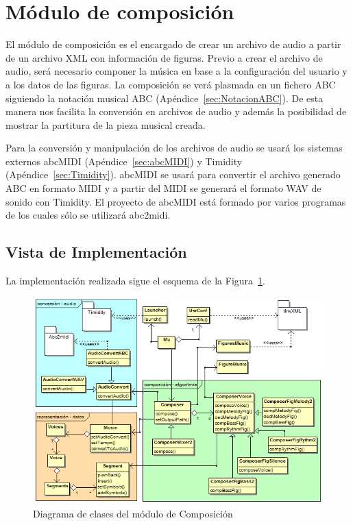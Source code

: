\section{Módulo de composición}


El módulo de composición es el encargado de crear un archivo de audio a partir de un archivo XML con información de figuras. Previo a crear el archivo de audio, será necesario componer la música en base a la configuración del usuario y a los datos de las figuras. La composición se verá plasmada en un fichero ABC siguiendo la notación musical ABC \color{blue}(Apéndice~\ref{sec:NotacionABC})\color{black}. De esta manera nos facilita la conversión en archivos de audio y además la posibilidad de mostrar la partitura de la pieza musical creada.

\color{blue}
Para la conversión y manipulación de los archivos de audio se usará los sistemas externos abcMIDI (Apéndice~\ref{sec:abcMIDI}) y Timidity (Apéndice~\ref{sec:Timidity}). abcMIDI se usará para convertir el archivo generado ABC en formato MIDI y a partir del MIDI se generará el formato WAV de sonido con Timidity. El proyecto de abcMIDI está formado por varios programas de los cuales sólo se utilizará abc2midi.
\color{black}

\subsection{Vista de Implementación}
La implementación realizada sigue el esquema de la Figura~\ref{fig:diagramaclasesMu}.\\

		\begin{figure}[!htbp]
		\centering
		\hspace*{0.0in}
		\includegraphics[scale=0.56]{graphics/diagramaclasesMU.png}
		\caption{Diagrama de clases del módulo de Composición}
		\label{fig:diagramaclasesMu}
		\end{figure}

